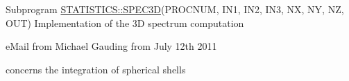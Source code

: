 \label{todo__todo000001}
\hypertarget{todo__todo000001}{}
 
\begin{DoxyDescription}
\item[Subprogram \hyperlink{namespaceSTATISTICS_abb792b2e62e57165b7e93764e07d1100}{STATISTICS::SPEC3D}(PROCNUM, IN1, IN2, IN3, NX, NY, NZ, OUT) ]Implementation of the 3D spectrum computation\par
 eMail from Michael Gauding from July 12th 2011\par
 concerns the integration of spherical shells 
\end{DoxyDescription}